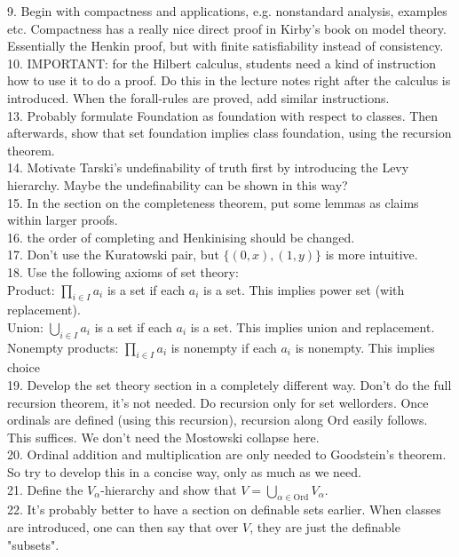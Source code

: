 \documentclass[a4paper, 11pt]{amsart}
\theoremstyle{remark}
\newcommand{\Ord}{\mathrm{Ord}}
\begin{document}
{9. Begin with compactness and applications, e.g. nonstandard analysis, examples etc. 
Compactness has a really nice direct proof in Kirby's book on model theory. Essentially the Henkin proof, but with finite satisfiability instead of consistency. \\ 
10. IMPORTANT: for the Hilbert calculus, students need a kind of instruction how to use it to do a proof. Do this in the lecture notes right after the calculus is introduced. When the forall-rules are proved, add similar instructions. \\ 
13. Probably formulate Foundation as foundation with respect to classes. 
Then afterwards, show that set foundation implies class foundation, using the recursion theorem. \\ 
14. Motivate Tarski's undefinability of truth first by introducing the Levy hierarchy. Maybe the undefinability can be shown in this way? \\ 
15. In the section on the completeness theorem, put some lemmas as claims within larger proofs. \\ 
16. the order of completing and Henkinising should be changed. \\ 
17. Don't use the Kuratowski pair, but $\{(0,x), (1,y)\}$ is more intuitive. \\ 
18. Use the following axioms of set theory: \\ 
Product: $\prod_{i\in I} a_i$ is a set if each $a_i$ is a set. This implies power set (with replacement). \\ 
Union: $\bigcup_{i\in I} a_i$ is a set if each $a_i$ is a set. This implies union and replacement. \\ 
Nonempty products: $\prod_{i\in I} a_i$ is nonempty if each $a_i$ is nonempty. This implies choice \\ 
19. Develop the set theory section in a completely different way. Don't do the full recursion theorem, it's not needed. Do recursion only for set wellorders. 
Once ordinals are defined (using this recursion), recursion along $\Ord$ easily follows. This suffices. We don't need the Mostowski collapse here. \\ 
20. Ordinal addition and multiplication are only needed to Goodstein's theorem. So try to develop this in a concise way, only as much as we need. \\ 
21. Define the $V_\alpha$-hierarchy and show that $V=\bigcup_{\alpha\in \Ord} V_\alpha$. \\ 
22. It's probably better to have a section on definable sets earlier. When classes are introduced, one can then say that over $V$, they are just the definable "subsets". \\ 
}
\end{document}
